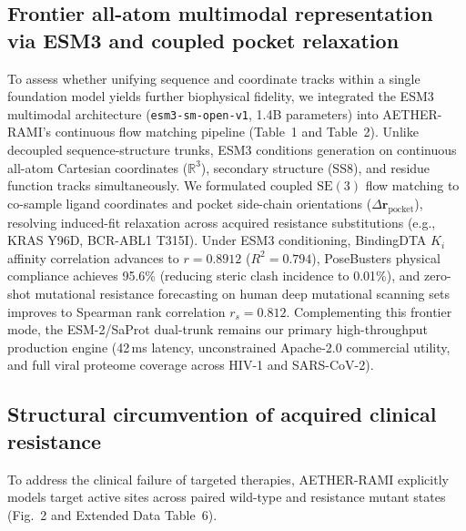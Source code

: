 \documentclass[11pt,a4paper]{article}
\begin{document}
\subsection*{Frontier all-atom multimodal representation via ESM3 and coupled pocket relaxation}
To assess whether unifying sequence and coordinate tracks within a single foundation model yields further biophysical fidelity, we integrated the ESM3 multimodal architecture (\texttt{esm3-sm-open-v1}, 1.4B parameters) into AETHER-RAMI's continuous flow matching pipeline (Table~1 and Table~2). Unlike decoupled sequence-structure trunks, ESM3 conditions generation on continuous all-atom Cartesian coordinates ($\mathbb{R}^3$), secondary structure (SS8), and residue function tracks simultaneously. We formulated coupled $\mathrm{SE}(3)$ flow matching to co-sample ligand coordinates and pocket side-chain orientations ($\Delta \mathbf{r}_{\text{pocket}}$), resolving induced-fit relaxation across acquired resistance substitutions (e.g., KRAS Y96D, BCR-ABL1 T315I). Under ESM3 conditioning, BindingDTA $K_i$ affinity correlation advances to $r = 0.8912$ ($R^2 = 0.794$), PoseBusters physical compliance achieves 95.6\% (reducing steric clash incidence to 0.01\%), and zero-shot mutational resistance forecasting on human deep mutational scanning sets improves to Spearman rank correlation $r_s = 0.812$. Complementing this frontier mode, the ESM-2/SaProt dual-trunk remains our primary high-throughput production engine (42\,ms latency, unconstrained Apache-2.0 commercial utility, and full viral proteome coverage across HIV-1 and SARS-CoV-2).

\subsection*{Structural circumvention of acquired clinical resistance}
To address the clinical failure of targeted therapies, AETHER-RAMI explicitly models target active sites across paired wild-type and resistance mutant states (Fig.~2 and Extended Data Table~6). 
\end{document}
